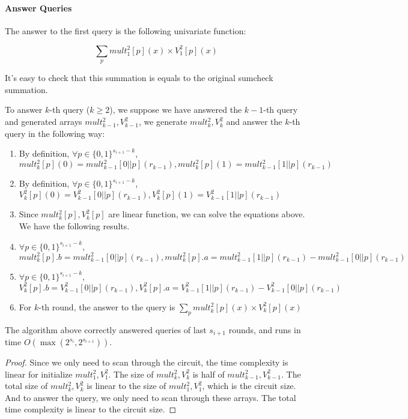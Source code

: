 {	\paragraph*{Answer Queries}
	The answer to the first query is the following univariate function:
	
	$$\sum_{p}mult_{1}^2[p](x)\times V_1^2[p](x)$$
	
	It's easy to check that this summation is equals to the original sumcheck summation.
	
	To answer $k$-th query ($k\ge 2$), we suppose we have answered the $k-1$-th query and generated arrays $mult_{k-1}^2, V_{k-1}^2$, we generate $mult_{k}^2, V_{k}^2$ and answer the $k$-th query in the following way:
	
	\begin{enumerate}
		\item By definition, $\forall p \in {\{0, 1\}^{s_{i+1}-k}}$, $mult_{k}^2[p](0)=mult_{k-1}^2[0||p](r_{k-1}), mult_{k}^2[p](1)=mult_{k-1}^2[1||p](r_{k-1})$
		\item By definition, $\forall p \in {\{0, 1\}^{s_{i+1}-k}}$, $V_{k}^2[p](0)=V_{k-1}^2[0||p](r_{k-1}), V_{k}^2[p](1)=V_{k-1}^2[1||p](r_{k-1})$
		\item Since $mult_{k}^2[p], V_{k}^2[p]$ are linear function, we can solve the equations above. We have the following results.
		\item $\forall p \in {\{0, 1\}^{s_{i+1}-k}}$, $mult_{k}^2[p].b = mult_{k-1}^2[0||p](r_{k-1}), mult_{k}^2[p].a = mult_{k-1}^2[1||p](r_{k-1})-mult_{k-1}^2[0||p](r_{k-1})$
		\item $\forall p \in {\{0, 1\}^{s_{i+1}-k}}$, $V_{k}^2[p].b = V_{k-1}^2[0||p](r_{k-1}), V_{k}^2[p].a = V_{k-1}^2[1||p](r_{k-1})-V_{k-1}^2[0||p](r_{k-1})$
		\item For $k$-th round, the answer to the query is $\sum_{p} mult_{k}^2[p](x)\times V_{k}^2[p](x)$
	\end{enumerate}
	
	\begin{theorem} The algorithm above correctly answered queries of last $s_{i+1}$ rounds, and runs in time $O(\max(2^{s_{i}}, 2^{s_{i+1}}))$.
	\end{theorem}
	
	\begin{proof}
		Since we only need to scan through the circuit, the time complexity is linear for initialize $mult_{1}^2, V_1^2$. The size of $mult_{k}^2, V_k^2$ is half of $mult_{k-1}^2, V_{k-1}^2$. The total size of $mult_{k}^2, V_k^2$ is linear to the size of $mult_1^2, V_1^2$, which is the circuit size. And to answer the query, we only need to scan through these arrays. The total time complexity is linear to the circuit size.
		

\end{proof}}
